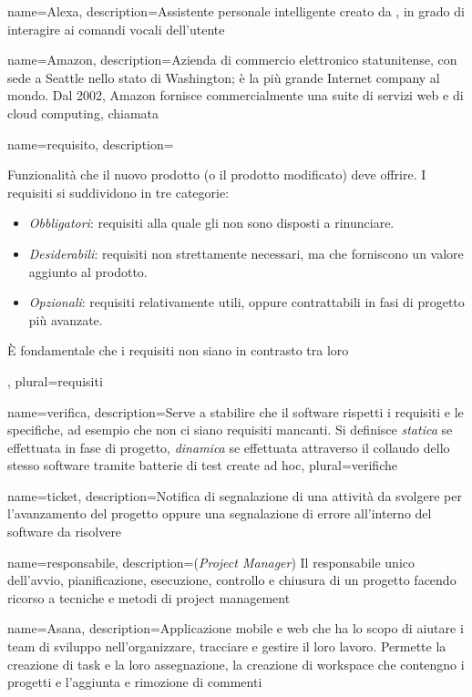 
{
  name=Alexa,
  description={Assistente personale intelligente creato da , in grado di interagire ai comandi vocali dell'utente}
}

{
	name=Amazon,
	description={Azienda di commercio elettronico statunitense, con sede a Seattle nello stato di Washington; è la più grande Internet company al mondo. Dal 2002, Amazon fornisce commercialmente una suite di servizi web e di cloud computing, chiamata } 
}

{
  name=requisito,
  description={Funzionalità che il nuovo prodotto (o il prodotto modificato) deve offrire. I requisiti si suddividono in tre categorie:
  \begin{itemize}
  \item \emph{Obbligatori}: requisiti alla quale gli  non sono disposti a rinunciare.
  \item \emph{Desiderabili}: requisiti non strettamente necessari, ma che forniscono un valore aggiunto al prodotto.
  \item \emph{Opzionali}: requisiti relativamente utili, oppure contrattabili in fasi di progetto più avanzate.
  \end{itemize}
  \`E fondamentale che i requisiti non siano in contrasto tra loro},
  plural=requisiti
}

{
  name=verifica,
  description={Serve a stabilire che il software rispetti i requisiti e le specifiche, ad esempio che non ci siano requisiti mancanti. Si definisce \emph{statica} se effettuata in fase di progetto, \emph{dinamica} se effettuata attraverso il collaudo dello stesso software tramite batterie di test create ad hoc},
  plural=verifiche
}

{
  name=ticket,
  description={Notifica di segnalazione di una attività da svolgere per l’avanzamento del progetto oppure una segnalazione di errore all’interno del software da risolvere}
}

{
  name=responsabile,
  description={(\emph{Project Manager}) Il responsabile unico dell'avvio, pianificazione, esecuzione, controllo e chiusura di un progetto facendo ricorso a tecniche e metodi di project management}
}

{
  name=Asana,
  description={Applicazione mobile e web che ha lo scopo di aiutare i team di sviluppo nell'organizzare, tracciare e gestire il loro lavoro. Permette la creazione di task e la loro assegnazione, la creazione di workspace che contengno i progetti e l’aggiunta e rimozione di commenti}
}

